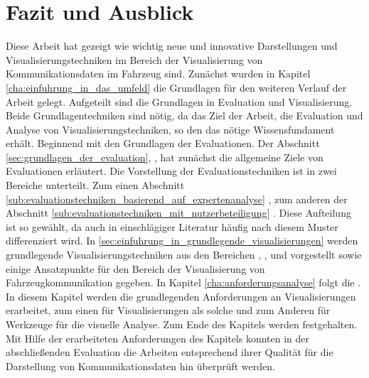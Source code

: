 \documentclass[draft=false
              ,paper=a4
              ,twoside=false
              ,fontsize=11pt
              ,headsepline
              ,BCOR10mm
              ,DIV11
              ]{scrbook}
\begin{document}
\chapter{Fazit und Ausblick} %
\label{cha:fazit_und_ausblick}
Diese Arbeit hat gezeigt wie wichtig neue und innovative Darstellungen und Visualisierungstechniken im Bereich der Visualisierung von Kommunikationsdaten im Fahrzeug sind. Zunächst wurden in Kapitel \ref{cha:einfuhrung_in_das_umfeld} die Grundlagen für den weiteren Verlauf der Arbeit gelegt. Aufgeteilt sind die Grundlagen in Evaluation und Visualisierung. Beide Grundlagentechniken sind nötig, da das Ziel der Arbeit, die Evaluation und Analyse von Visualisierungstechniken, so den das nötige Wissensfundament erhält. Beginnend mit den Grundlagen der Evaluationen. Der Abschnitt \ref{sec:grundlagen_der_evaluation}, , hat zunächst die allgemeine Ziele von Evaluationen erläutert. Die Vorstellung der Evaluationstechniken ist in zwei Bereiche unterteilt. Zum einen Abschnitt \ref{sub:evaluationstechniken_basierend_auf_expertenanalyse} , zum anderen der Abschnitt \ref{sub:evaluationstechniken_mit_nutzerbeteiligung} . Diese Aufteilung ist so gewählt, da auch in einschlägiger Literatur häufig nach diesem Muster differenziert wird. In \ref{sec:einfuhrung_in_grundlegende_visualisierungen}  werden grundlegende Visualisierungstechniken aus den Bereichen , ,  und  vorgestellt sowie einige Ansatzpunkte für den Bereich der Visualisierung von Fahrzeugkommunikation gegeben. 
In Kapitel \ref{cha:anforderungsanalyse} folgt die . In diesem Kapitel werden die grundlegenden Anforderungen an Visualisierungen erarbeitet, zum einen für Visualisierungen als solche und zum Anderen für Werkzeuge für die visuelle Analyse. Zum Ende des Kapitels werden  
festgehalten. Mit Hilfe der erarbeiteten Anforderungen des Kapitels konnten in der abschließenden Evaluation die Arbeiten entsprechend ihrer Qualität für die Darstellung von Kommunikationsdaten hin überprüft werden.
\end{document}
